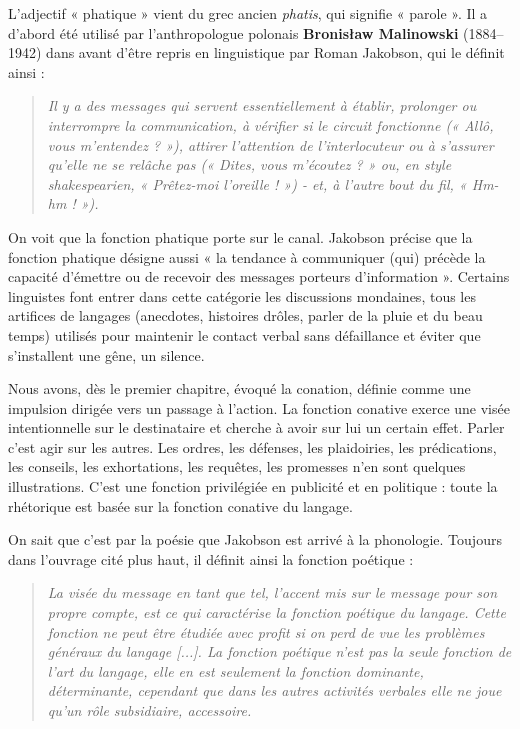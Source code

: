 L’adjectif « phatique » vient du grec ancien \textit{phatis}, qui signifie « parole ». Il a d’abord été utilisé par l’anthropologue polonais \textbf{Bronisław Malinowski} (1884–1942) dans avant d’être repris en linguistique par Roman Jakobson, qui le définit ainsi :
\begin{quote}\small\itshape
Il y a des messages qui servent essentiellement à établir, prolonger ou interrompre la communication, à vérifier si le circuit fonctionne (« Allô, vous m’entendez ? »), attirer l’attention de l’interlocuteur ou à s’assurer qu’elle ne se relâche pas (« Dites, vous m’écoutez ? » ou, en style shakespearien, « Prêtez-moi l’oreille ! ») - et, à l’autre bout du fil, « Hm-hm ! »).
\end{quote}
On voit que la fonction phatique porte sur le canal. Jakobson précise que la fonction phatique désigne aussi « la tendance à communiquer (qui) précède la capacité d’émettre ou de recevoir des messages porteurs d’information ». Certains linguistes font entrer dans cette catégorie les discussions mondaines, tous les artifices de langages (anecdotes, histoires drôles, parler de la pluie et du beau temps) utilisés pour maintenir le contact verbal sans défaillance et éviter que s’installent une gêne, un silence.

Nous avons, dès le premier chapitre, évoqué la conation, définie comme une impulsion dirigée vers un passage à l’action. La fonction conative exerce une visée intentionnelle sur le destinataire et cherche à avoir sur lui un certain effet. Parler c’est agir sur les autres. Les ordres, les défenses, les plaidoiries, les prédications, les conseils, les exhortations, les requêtes, les promesses n’en sont quelques illustrations. C’est une fonction privilégiée en publicité et en politique : toute la rhétorique est basée sur la fonction conative du langage.

On sait que c’est par la poésie que Jakobson est arrivé à la phonologie. Toujours dans l’ouvrage cité plus haut, il définit ainsi la fonction poétique :
\begin{quote}\small\itshape
La visée du message en tant que tel, l’accent mis sur le message pour son propre compte, est ce qui caractérise la fonction poétique du langage. Cette fonction ne peut être étudiée avec profit si on perd de vue les problèmes généraux du langage [...]. La fonction poétique n’est pas la seule fonction de l’art du langage, elle en est seulement la fonction dominante, déterminante, cependant que dans les autres activités verbales elle ne joue qu’un rôle subsidiaire, accessoire.
\end{quote}


